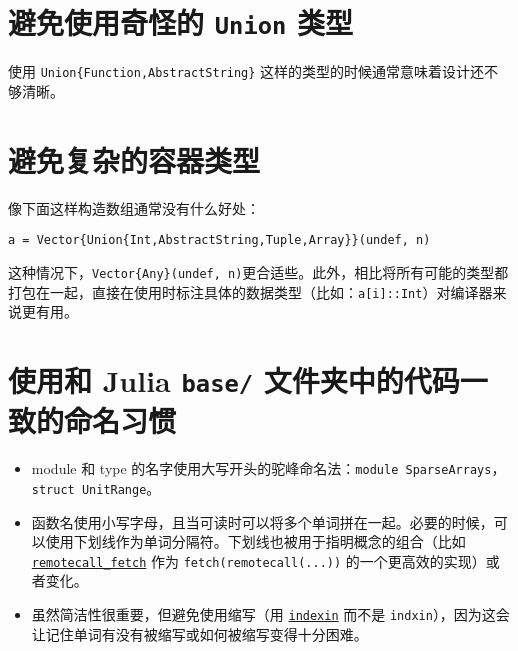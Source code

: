 \section{避免使用奇怪的 \texttt{Union} 类型}



使用 \texttt{Union\{Function,AbstractString\}} 这样的类型的时候通常意味着设计还不够清晰。



\hypertarget{6548025962580232135}{}


\section{避免复杂的容器类型}



像下面这样构造数组通常没有什么好处：




\begin{verbatim}
a = Vector{Union{Int,AbstractString,Tuple,Array}}(undef, n)
\end{verbatim}



这种情况下，\texttt{Vector\{Any\}(undef, n)}更合适些。此外，相比将所有可能的类型都打包在一起，直接在使用时标注具体的数据类型（比如：\texttt{a[i]::Int}）对编译器来说更有用。



\hypertarget{17294992054689205687}{}


\section{使用和 Julia \texttt{base/} 文件夹中的代码一致的命名习惯}



\begin{itemize}
\item module 和 type 的名字使用大写开头的驼峰命名法：\texttt{module SparseArrays}，\texttt{struct UnitRange}。


\item 函数名使用小写字母，且当可读时可以将多个单词拼在一起。必要的时候，可以使用下划线作为单词分隔符。下划线也被用于指明概念的组合（比如 \hyperlink{14909184572421937971}{\texttt{remotecall\_fetch}} 作为 \texttt{fetch(remotecall(...))} 的一个更高效的实现）或者变化。


\item 虽然简洁性很重要，但避免使用缩写（用 \hyperlink{16333903346703258373}{\texttt{indexin}} 而不是 \texttt{indxin}），因为这会让记住单词有没有被缩写或如何被缩写变得十分困难。

\end{itemize}


